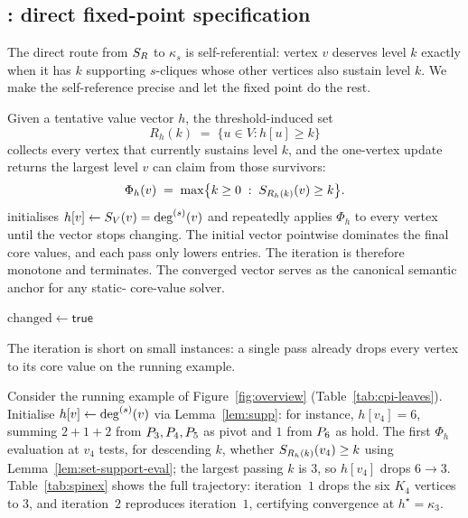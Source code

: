 \subsection{\texorpdfstring{\spin{}: direct fixed-point specification}{SPIN: direct fixed-point specification}}\label{sec:localh}

The direct route from $S_R$ to $\kappa_s$ is self-referential: vertex $v$ deserves level $k$ exactly when it has $k$ supporting $s$-cliques whose other vertices also sustain level $k$.
%
We make the self-reference precise and let the fixed point do the rest.

Given a tentative value vector $h$, the threshold-induced set
\[
  R_h(k) \;=\; \{u\in V : h[u]\ge k\}
\]
collects every vertex that currently sustains level $k$, and the one-vertex update returns the largest level $v$ can claim from those survivors:
\[
  \Phi_h(v) \;=\; \max\bigl\{k\ge 0 \;:\; S_{R_h(k)}(v)\ge k\bigr\}.
\]
\spin{} initialises $h[v]\gets S_V(v)=\deg^{(s)}(v)$ and repeatedly applies $\Phi_h$ to every vertex until the vector stops changing.
%
The initial vector pointwise dominates the final core values, and each pass only lowers entries.
%
The iteration is therefore monotone and terminates.
%
The converged vector serves as the canonical semantic anchor for any static-\cpi{} core-value solver.

\begin{algorithm}[t]
\algfontsize
\caption{\spin{}: direct fixed-point iteration over set support.}
\label{alg:localH}

$\mathrm{changed}\gets\textsf{true}$\;
\end{algorithm}

The iteration is short on small instances: a single pass already drops every vertex to its core value on the running example.

\begin{example}\label{ex:hop}
Consider the running example of Figure~\ref{fig:overview} (Table~\ref{tab:cpi-leaves}).
%
Initialise $h[v]\gets\deg^{(s)}(v)$ via Lemma~\ref{lem:supp}: for instance, $h[v_4]\!=\!6$, summing $2{+}1{+}2$ from $\TPath_3,\TPath_4,\TPath_5$ as pivot and $1$ from $\TPath_6$ as hold.
%
The first $\Phi_h$ evaluation at $v_4$ tests, for descending $k$, whether $S_{R_h(k)}(v_4)\ge k$ using Lemma~\ref{lem:set-support-eval}; the largest passing $k$ is $3$, so $h[v_4]$ drops $6\!\to\!3$.
%
Table~\ref{tab:spinex} shows the full trajectory: iteration~$1$ drops the six $K_4$ vertices to $3$, and iteration~$2$ reproduces iteration~$1$, certifying convergence at $h^\star\!=\!\kappa_3$.
\end{example}

